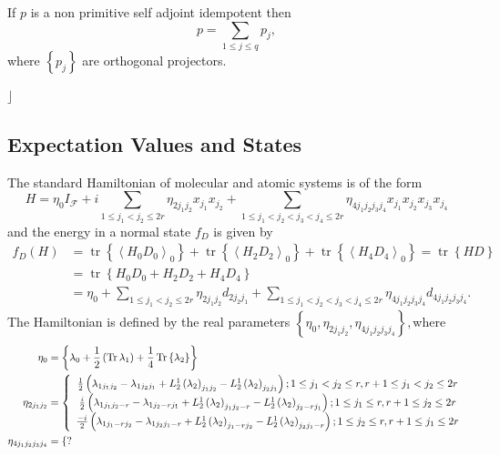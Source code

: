 \documentclass[aps,preprint]{revtex4}%
\begin{document}
If $p$ is a non primitive self adjoint idempotent then
\begin{equation}
p=%
{\textstyle\sum\limits_{1\leq j\leq q}}
p_{j},
\end{equation}
where $\left\{  p_{j}\right\}  $ are orthogonal projectors.

$\rfloor$\emph{ }

\subsection{Expectation Values and States}

The standard Hamiltonian of molecular and atomic systems is of the form
\begin{equation}
H=\eta_{0}I_{\mathcal{F}}+i\sum_{1\leq j_{1}<j_{2}\leq2r}\eta_{2j_{1}j_{2}%
}x_{j_{1}}x_{j_{2}}+\sum_{1\leq j_{1}<j_{2}<j_{3}<j_{4}\leq2r}\eta
_{4j_{1}j_{2}j_{3}j_{4}}x_{j_{1}}x_{j_{2}}x_{j_{3}}x_{j_{4}}%
\end{equation}
and the energy in a normal state $f_{D}$ is given by
\begin{align}
f_{D}\left(  H\right)   &  =\operatorname*{tr}\left\{  \left\langle H_{0}%
D_{0}\right\rangle _{0}\right\}  +\operatorname*{tr}\left\{  \left\langle
H_{2}D_{2}\right\rangle _{0}\right\}  +\operatorname*{tr}\left\{  \left\langle
H_{4}D_{4}\right\rangle _{0}\right\}  =\operatorname*{tr}\left\{  HD\right\}
\nonumber\\
&  =\operatorname*{tr}\left\{  H_{0}D_{0}+H_{2}D_{2}+H_{4}D_{4}\right\}
\nonumber\\
&  =\eta_{0}+\sum_{1\leq j_{1}<j_{2}\leq2r}\eta_{2j_{1}j_{2}}d_{2j_{2}j_{1}%
}+\sum_{1\leq j_{1}<j_{2}<j_{3}<j_{4}\leq2r}\eta_{4j_{1}j_{2}j_{3}j_{4}%
}d_{4j_{1}j_{2}j_{3}j_{4}}.
\end{align}
The Hamiltonian is defined by the real parameters $\left\{  \eta_{0}%
,\eta_{2j_{1}j_{2}},\eta_{4j_{1}j_{2}j_{3}j_{4}}\right\}  ,$where
\begin{align}
\eta_{0} &  =\left\{  \lambda_{0}+\frac{1}{2}\left(  \operatorname*{Tr}%
\lambda_{1}\right)  +\frac{1}{4}\operatorname*{Tr}\left\{  \lambda
_{2}\right\}  \right\}  \nonumber\\
\eta_{2j_{1}j_{2}} &  =\left\{
\begin{array}
[c]{c}%
\frac{1}{2}\left(  \lambda_{1j_{1}j_{2}}-\lambda_{1j_{2}j_{1}}+L_{2}%
^{1}\left(  \lambda_{2}\right)  _{j_{1}j_{2}}-L_{2}^{1}\left(  \lambda
_{2}\right)  _{j_{2}j_{1}}\right)  ;1\leq j_{1}<j_{2}\leq r,r+1\leq
j_{1}<j_{2}\leq2r\\
\frac{i}{2}\left(  \lambda_{1j_{1}j_{2}-r}-\lambda_{1j_{2}-rj_{1}}+L_{2}%
^{1}\left(  \lambda_{2}\right)  _{j_{1}j_{2}-r}-L_{2}^{1}\left(  \lambda
_{2}\right)  _{j_{2}-rj_{1}}\right)  ;1\leq j_{1}\leq r,r+1\leq j_{2}\leq2r\\
\frac{-i}{2}\left(  \lambda_{1j_{1}-rj_{2}}-\lambda_{1j_{2}j_{1}-r}+L_{2}%
^{1}\left(  \lambda_{2}\right)  _{j_{1}-rj_{2}}-L_{2}^{1}\left(  \lambda
_{2}\right)  _{j_{2}j_{1}-r}\right)  ;1\leq j_{2}\leq r,r+1\leq j_{1}\leq2r
\end{array}
\right.  \\
\eta_{4j_{1}j_{2}j_{3}j_{4}} &  =\left\{  ?\right.
\end{align}
\end{document}
